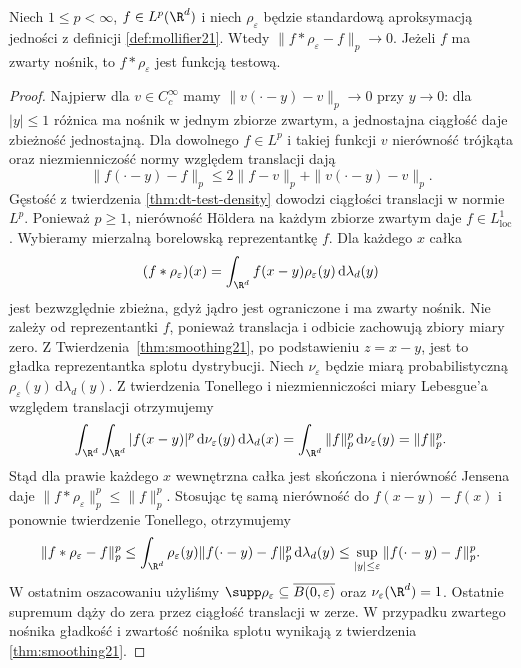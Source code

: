 \begin{twierdzenie}
\label{thm:dt-approx-lp}
Niech $1\le p<\infty$, $f\in L^p(\R^d)$ i niech
$\rho_\varepsilon$ będzie standardową aproksymacją
jedności z definicji \ref{def:mollifier21}.
Wtedy $\|f*\rho_\varepsilon-f\|_p\to0$.
Jeżeli $f$ ma zwarty nośnik, to $f*\rho_\varepsilon$
jest funkcją testową.
\end{twierdzenie}
\begin{proof}
Najpierw dla $v\in C_c^\infty$ mamy
$\|v(\cdot-y)-v\|_p\to0$ przy $y\to0$:
dla $|y|\le1$ różnica ma nośnik w jednym zbiorze
zwartym, a jednostajna ciągłość daje zbieżność
jednostajną. Dla dowolnego $f\in L^p$
i takiej funkcji $v$ nierówność trójkąta
oraz niezmienniczość normy względem translacji dają
\[
 \|f(\cdot-y)-f\|_p\le2\|f-v\|_p+\|v(\cdot-y)-v\|_p.
\]
Gęstość z twierdzenia \ref{thm:dt-test-density}
dowodzi ciągłości translacji w normie $L^p$.
Ponieważ $p\ge1$, nierówność Höldera na każdym
zbiorze zwartym daje $f\in L^1_{\mathrm{loc}}$.
Wybieramy mierzalną borelowską reprezentantkę $f$.
Dla każdego $x$ całka
\[
 (f*\rho_\varepsilon)(x)=
 \int_{\R^d}f(x-y)\rho_\varepsilon(y)\,\mathrm d\lambda_d(y)
\]
jest bezwzględnie zbieżna, gdyż jądro jest ograniczone
i ma zwarty nośnik. Nie zależy od reprezentantki $f$,
ponieważ translacja i odbicie zachowują zbiory miary zero.
Z Twierdzenia~\ref{thm:smoothing21}, po podstawieniu
$z=x-y$, jest to gładka reprezentantka splotu dystrybucji.
Niech $\nu_\varepsilon$ będzie miarą probabilistyczną
$\rho_\varepsilon(y)\,\mathrm d\lambda_d(y)$.
Z twierdzenia Tonellego i niezmienniczości miary
Lebesgue'a względem translacji otrzymujemy
\[
 \int_{\R^d}\int_{\R^d}|f(x-y)|^p
 \,\mathrm d\nu_\varepsilon(y)\,\mathrm d\lambda_d(x)
 =\int_{\R^d}\|f\|_p^p\,\mathrm d\nu_\varepsilon(y)
 =\|f\|_p^p.
\]
Stąd dla prawie każdego $x$ wewnętrzna całka jest
skończona i nierówność Jensena daje
$\|f*\rho_\varepsilon\|_p^p\le\|f\|_p^p$.
Stosując tę samą nierówność do $f(x-y)-f(x)$
i ponownie twierdzenie Tonellego, otrzymujemy
\[
 \|f*\rho_\varepsilon-f\|_p^p
 \le \int_{\R^d}\rho_\varepsilon(y)
            \|f(\cdot-y)-f\|_p^p\,\mathrm d\lambda_d(y)
 \le\sup_{|y|\le\varepsilon}\|f(\cdot-y)-f\|_p^p.
\]
W ostatnim oszacowaniu użyliśmy
$\supp\rho_\varepsilon\subseteq\overline{B(0,\varepsilon)}$
oraz $\nu_\varepsilon(\R^d)=1$.
Ostatnie supremum dąży do zera przez ciągłość
translacji w zerze.
W przypadku zwartego nośnika gładkość i zwartość
nośnika splotu wynikają z twierdzenia
\ref{thm:smoothing21}.
\end{proof}

